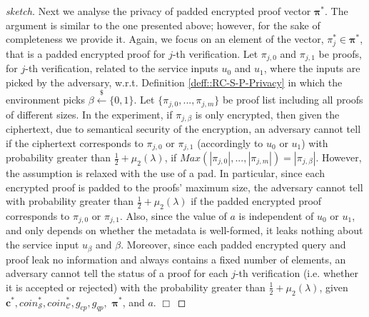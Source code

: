 \begin{proof}[sketch]
Next we analyse the privacy of padded encrypted proof vector $\bm{\pi}^{\scriptscriptstyle *}$. The argument is similar to the one presented above; however, for  the sake of completeness we provide it.  Again, we focus on an element of the vector,  $\pi_{\scriptscriptstyle j}^{\scriptscriptstyle *}\in\bm{\pi}^{\scriptscriptstyle *}$, that is a padded encrypted proof for $j$-th verification. Let $\pi_{\scriptscriptstyle j,0}$ and $\pi_{\scriptscriptstyle j,1}$  be proofs, for $j$-th verification, related to the service inputs $u_{\scriptscriptstyle 0}$ and $u_{\scriptscriptstyle 1}$, where the inputs   are picked by the adversary, w.r.t. Definition  \ref{deff::RC-S-P-Privacy} in which  the environment picks $\beta\stackrel{\scriptscriptstyle\$}\leftarrow \{0,1\}$.  Let $\{\pi_{\scriptscriptstyle j,0},...,\pi_{\scriptscriptstyle j,m}\}$ be proof list including all proofs of different sizes. In the experiment, if $\pi_{\scriptscriptstyle j,\beta}$  is only   encrypted, then given the ciphertext, due to semantical security of the encryption, an adversary cannot tell if the ciphertext corresponds to $\pi_{\scriptscriptstyle j,0}$ or $\pi_{\scriptscriptstyle j,1}$  (accordingly to $u_{\scriptscriptstyle 0}$ or $u_{\scriptscriptstyle 1}$) with probability greater than $\frac{1}{2}+\mu_{\scriptscriptstyle 2}(\lambda)$,  if $Max(|\pi_{\scriptscriptstyle j,0}|,...,|\pi_{\scriptscriptstyle j,m}|)=|\pi_{\scriptscriptstyle j,\beta}|$. However, the  assumption is  relaxed with the use of a pad. In particular, since each encrypted proof is padded  to the proofs' maximum size, the adversary cannot tell with probability greater than $\frac{1}{2}+\mu_{\scriptscriptstyle 2}(\lambda)$ if the  padded encrypted proof corresponds to  $\pi_{\scriptscriptstyle j,0}$ or $\pi_{\scriptscriptstyle j,1}$. Also, since the value of $a$ is independent of $u_{\scriptscriptstyle 0}$  or $u_{\scriptscriptstyle 1}$, and only depends on whether the metadata is well-formed, it leaks nothing about the service input $u_{\scriptscriptstyle\beta}$ and $\beta$. Moreover, since each padded encrypted query and proof leak no information and always contains a fixed number of elements, an adversary cannot tell the status of a proof for each $j$-th verification (i.e. whether it is accepted or rejected) with the probability greater than $\frac{1}{2}+\mu_{\scriptscriptstyle 2}(\lambda)$, given  $\bm{c}^{\scriptscriptstyle *},coin^{\scriptscriptstyle *}_{\scriptscriptstyle \mathcal S},coin^{\scriptscriptstyle *}_{\scriptscriptstyle\mathcal C}, g_{\scriptscriptstyle cp},  g_{\scriptscriptstyle qp},$  $\bm{\pi}^{\scriptscriptstyle *}$, and $a$.
  \hfill\(\Box\)\end{proof}


